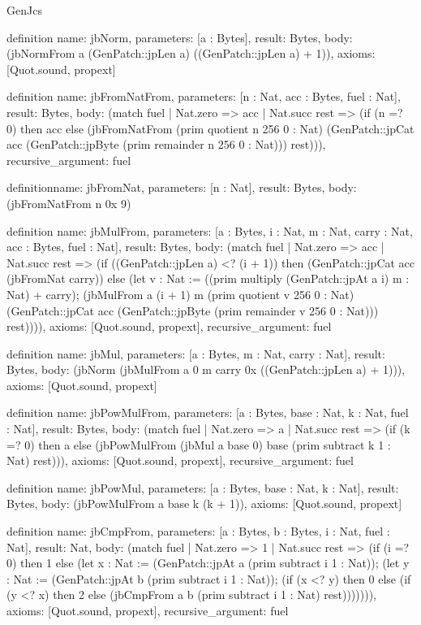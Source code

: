 \begin{lexlean}{GenJcs}
\begin{semanticmodule}
definition{
  name: jbNorm,
  parameters: [a : Bytes],
  result: Bytes,
  body: (jbNormFrom a (GenPatch::jpLen a) ((GenPatch::jpLen a) + 1)),
  axioms: [Quot.sound, propext]
}

definition{
  name: jbFromNatFrom,
  parameters: [n : Nat, acc : Bytes, fuel : Nat],
  result: Bytes,
  body: (match fuel
    | Nat.zero => acc
    | Nat.succ rest => (if (n =? 0) then acc else (jbFromNatFrom (prim quotient n 256 0 : Nat) (GenPatch::jpCat acc (GenPatch::jpByte (prim remainder n 256 0 : Nat))) rest))),
  recursive_argument: fuel
}

definition{name: jbFromNat, parameters: [n : Nat], result: Bytes, body: (jbFromNatFrom n 0x 9)}

definition{
  name: jbMulFrom,
  parameters: [a : Bytes, i : Nat, m : Nat, carry : Nat, acc : Bytes, fuel : Nat],
  result: Bytes,
  body: (match fuel
    | Nat.zero => acc
    | Nat.succ rest => (if ((GenPatch::jpLen a) <? (i + 1)) then (GenPatch::jpCat acc (jbFromNat carry)) else (let v : Nat := ((prim multiply (GenPatch::jpAt a i) m : Nat) + carry); (jbMulFrom a (i + 1) m (prim quotient v 256 0 : Nat) (GenPatch::jpCat acc (GenPatch::jpByte (prim remainder v 256 0 : Nat))) rest)))),
  axioms: [Quot.sound, propext],
  recursive_argument: fuel
}

definition{
  name: jbMul,
  parameters: [a : Bytes, m : Nat, carry : Nat],
  result: Bytes,
  body: (jbNorm (jbMulFrom a 0 m carry 0x ((GenPatch::jpLen a) + 1))),
  axioms: [Quot.sound, propext]
}

definition{
  name: jbPowMulFrom,
  parameters: [a : Bytes, base : Nat, k : Nat, fuel : Nat],
  result: Bytes,
  body: (match fuel
    | Nat.zero => a
    | Nat.succ rest => (if (k =? 0) then a else (jbPowMulFrom (jbMul a base 0) base (prim subtract k 1 : Nat) rest))),
  axioms: [Quot.sound, propext],
  recursive_argument: fuel
}

definition{
  name: jbPowMul,
  parameters: [a : Bytes, base : Nat, k : Nat],
  result: Bytes,
  body: (jbPowMulFrom a base k (k + 1)),
  axioms: [Quot.sound, propext]
}

definition{
  name: jbCmpFrom,
  parameters: [a : Bytes, b : Bytes, i : Nat, fuel : Nat],
  result: Nat,
  body: (match fuel
    | Nat.zero => 1
    | Nat.succ rest => (if (i =? 0) then 1 else (let x : Nat := (GenPatch::jpAt a (prim subtract i 1 : Nat)); (let y : Nat := (GenPatch::jpAt b (prim subtract i 1 : Nat)); (if (x <? y) then 0 else (if (y <? x) then 2 else (jbCmpFrom a b (prim subtract i 1 : Nat) rest))))))),
  axioms: [Quot.sound, propext],
  recursive_argument: fuel
}


\end{semanticmodule}
\end{lexlean}
